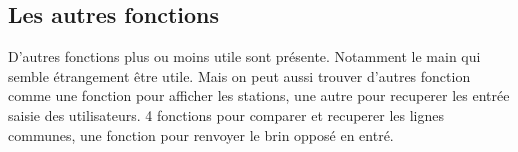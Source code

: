 \subsection{Les autres fonctions}
D'autres fonctions plus ou moins utile sont présente. Notamment le main qui semble étrangement être utile. Mais on peut aussi trouver d'autres fonction comme une fonction pour afficher les stations, une autre pour recuperer les entrée saisie des utilisateurs. 4 fonctions pour comparer et recuperer les lignes communes, une fonction pour renvoyer le brin opposé en entré.

